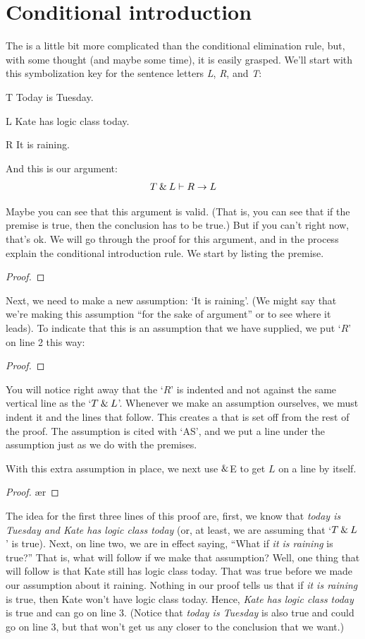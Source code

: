 \section{Conditional introduction}

The  is a little bit more complicated than the conditional elimination rule, but, with some thought (and maybe some time), it is easily grasped. We'll start with this symbolization key for the sentence letters \textit{L}, \textit{R}, and \textit{T}:
	\begin{ekey}
		\item[T] Today is Tuesday.
		\item[L] Kate has logic class today.
		\item[R] It is raining.
	\end{ekey}
And this is our argument: 
$$T \mathbin{\&} L \vdash R \rightarrow L$$
 
Maybe you can see that this argument is valid. (That is, you can see that if the premise is true, then the conclusion has to be true.) But if you can't right now, that's ok. We will go through the proof for this argument, and in the process explain the conditional introduction rule. We start by listing the premise.
	\begin{proof}
		 \pr{}
	\end{proof}
Next, we need to make a new assumption: `It is raining'. (We might say that we're making this assumption ``for the sake of argument'' or to see where it leads). To indicate that this is an assumption that we have supplied, we put `$R$' on line 2 this way:
	\begin{proof}
		 \pr{}
		\open
			 \as{}
	\end{proof}
You will notice right away that the `$R$' is indented and not against the same vertical line as the `$T \mathbin{\&} L$'. Whenever we make an assumption ourselves, we must indent it and the lines that follow. This creates a  that is set off from the rest of the proof. The assumption is cited with `AS', and we put a line under the assumption just as we do with the premises.

With this extra assumption in place, we next use $\mathbin{\&}$E to get $L$ on a line by itself.
	\begin{proof}
		 \pr{}
		\open
			 \as{}
			\ae{r}
	\end{proof}
The idea for the first three lines of this proof are, first, we know that \textit{today is Tuesday and Kate has logic class today} (or, at least, we are assuming that `$ T \mathbin{\&} L$' is true). Next, on line two, we are in effect saying, ``What if \textit{it is raining} is true?'' That is, what will follow if we make that assumption? Well, one thing that will follow is that Kate still has logic class today. That was true before we made our assumption about it raining. Nothing in our proof tells us that if \textit{it is raining} is true, then Kate won't have logic class today. Hence, \textit{Kate has logic class today} is true and can go on line 3. (Notice that \textit{today is Tuesday} is also true and could go on line 3, but that won't get us any closer to the conclusion that we want.)

